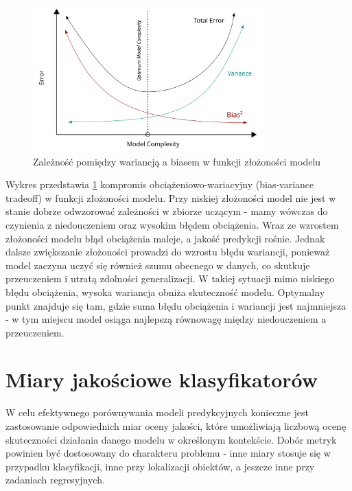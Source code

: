 \documentclass[a4paper,twoside,12pt]{book}
\begin{document}
\begin{figure}[!h]
	\centering
	\includegraphics[width=0.8\textwidth]{img/r3/Bias_and_variance_tradeoff.png}
	\caption{Zależność pomiędzy wariancją a biasem w funkcji złożoności modelu\cite{bigbossfarin2021}}
	\label{bias-variance tradeoff}
\end{figure}
\newpage
Wykres przedstawia \ref{bias-variance tradeoff} kompromis obciążeniowo-wariacyjny (bias-variance tradeoff) w funkcji złożoności modelu. Przy niskiej złożoności model nie jest w stanie dobrze odwzorować zależności w zbiorze uczącym - mamy wówczas do czynienia z niedouczeniem oraz wysokim błędem obciążenia. Wraz ze wzrostem złożoności modelu błąd obciążenia maleje, a jakość predykcji rośnie. Jednak dalsze zwiększanie złożoności prowadzi do wzrostu błędu wariancji, ponieważ model zaczyna uczyć się również szumu obecnego w danych, co skutkuje przeuczeniem i utratą zdolności generalizacji. W takiej sytuacji mimo niskiego błędu obciążenia, wysoka wariancja obniża skuteczność modelu. Optymalny punkt znajduje się tam, gdzie suma błędu obciążenia i wariancji jest najmniejsza - w tym miejscu model osiąga najlepszą równowagę między niedouczeniem a przeuczeniem.


\section{Miary jakościowe klasyfikatorów}
W celu efektywnego porównywania modeli predykcyjnych konieczne jest zastosowanie odpowiednich miar oceny jakości, które umożliwiają liczbową ocenę skuteczności działania danego modelu w określonym kontekście. Dobór metryk powinien być dostosowany do charakteru problemu - inne miary stosuje się w przypadku klasyfikacji, inne przy lokalizacji obiektów, a jeszcze inne przy zadaniach regresyjnych.\\
\end{document}
